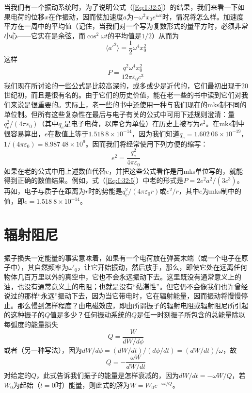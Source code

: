 当我们有一个振动系统时，为了说明公式（\ref{Eq:I:32:5}）的结果，我们来看一下如果电荷的位移$x$在作振动，因而使加速度$a$为$-\omega^2x_0e^{i\omega t}$时，情况将怎么样。加速度平方在一周中的平均值（记住，当我们对一个写为复数形式的量平方时，必须非常小心——它实在是余弦，而$\cos^2\omega t$的平均值是$1/2$）从而为
\begin{equation*}
    \langle a'^2 \rangle = \frac{1}{2}\omega^4x_0^2
\end{equation*}
这样
\begin{equation}
    \label{Eq:I:32:6}
    P = \frac{q^2\omega^4x_0^2}{12\pi\varepsilon_0c^3}
\end{equation}
我们现在所讨论的一些公式是比较高深的，或多或少是近代的，它们最初出现于20世纪初，而且是很有名的。由于它们的历史价值，能在老一些的书中读到它们对我们来说是很重要的。实际上，老一些的书中还使用一种与我们现在的mks制不同的单位制。但所有这些复杂性在最后与电子有关的公式中可用下述规则澄清：量$q_e^2/(4\pi\varepsilon_0)$（其中$q_e$是电子电荷，以库仑为单位）在历史上被写为$e^2$。在mks制中很容易算出，$e$在数值上等于$1.518~8\times 10^{-14}$，因为我们知道$q_e=1.602~06\times 10^{-19}$，$1/(4\pi\varepsilon_0)=8.987~48\times 10^9$。因而我们将经常使用下列方便的缩写：
\begin{equation}
    \label{Eq:I:32:7}
    e^2=\frac{q_e^2}{4\pi\varepsilon_0}
\end{equation}
如果在老的公式中用上述数值代替$e$，并把这些公式看作是用mks单位写的，就能得到正确的数值结果。例如，式（\ref{Eq:I:32:5}）中老的形式是$P=2e^2a^2/(3c^3)$。再如，电子与质子在距离为$r$时的势能是$q_e^2/(4\pi\varepsilon_0r)$或$e^2/r$，其中$e$为mks制中的值，即$e=1.518~8\times 10^{-14}$。

\section{辐射阻尼}

振子损失一定能量的事实意味着，如果有一个电荷放在弹簧末端（或一个电子在原子中），其自然频率为$\omega'_0$，让它开始振动，然后放手，那么，即使它处在远离任何物体几百万里以外的真空中，它也不会永远振动下去。这里既没有通常意义上的油，也没有通常意义上的电阻；也就是没有“黏滞性”。但它仍不会像我们也许曾经说过的那样“永远”振动下去，因为当它带电时，它在辐射能量，因而振动将慢慢停止。那么慢到怎样程度？由电磁效应，即由所谓振子的辐射电阻或辐射阻尼所引起的这种振子的$Q$值是多少？任何振动系统的$Q$是任一时刻振子所包含的总能量除以每弧度的能量损失
\begin{equation*}
    Q=\frac{W}{dW/d\phi}
\end{equation*}
或者（另一种写法），因为$dW/d\phi = (dW/dt)/(d\phi/dt) = (dW/dt)/\omega$，故
\begin{equation}
    \label{Eq:I:32:8}
    Q=-\frac{\omega W}{dW / dt}
\end{equation}
对给定的$Q$，此式告诉我们振子的能量是怎样衰减的，因为$dW/dt=-\omega W/Q$，若$W_0$为起始（$t=0$时）能量，则此式的解为$W=W_0e^{-\omega t/Q}$。

